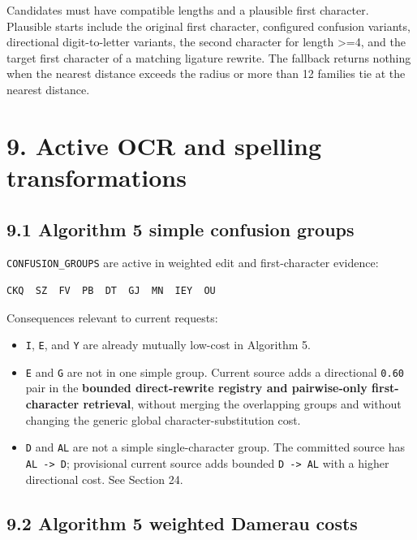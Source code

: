 Candidates must have compatible lengths and a plausible first character. Plausible starts include the original first character, configured confusion variants, directional digit-to-letter variants, the second character for length \textgreater=4, and the target first character of a matching ligature rewrite. The fallback returns nothing when the nearest distance exceeds the radius or more than 12 families tie at the nearest distance.

\section{9. Active OCR and spelling transformations}\label{9-active-ocr-and-spelling-transformations}

\subsection{9.1 Algorithm 5 simple confusion groups}\label{91-algorithm-5-simple-confusion-groups}

\texttt{CONFUSION\_\allowbreak{}GROUPS} are active in weighted edit and first-character evidence:

\begin{verbatim}
CKQ  SZ  FV  PB  DT  GJ  MN  IEY  OU
\end{verbatim}

Consequences relevant to current requests:

\begin{itemize}
\tightlist
\item
  \texttt{I}, \texttt{E}, and \texttt{Y} are already mutually low-cost in Algorithm 5.
\item
  \texttt{E} and \texttt{G} are not in one simple group. Current source adds a directional \texttt{0.60} pair in the \textbf{bounded direct-rewrite registry and pairwise-only first-character retrieval}, without merging the overlapping groups and without changing the generic global character-substitution cost.
\item
  \texttt{D} and \texttt{AL} are not a simple single-character group. The committed source has \texttt{AL\ -\textgreater{}\ D}; provisional current source adds bounded \texttt{D\ -\textgreater{}\ AL} with a higher directional cost. See Section 24.
\end{itemize}

\subsection{9.2 Algorithm 5 weighted Damerau costs}\label{92-algorithm-5-weighted-damerau-costs}

